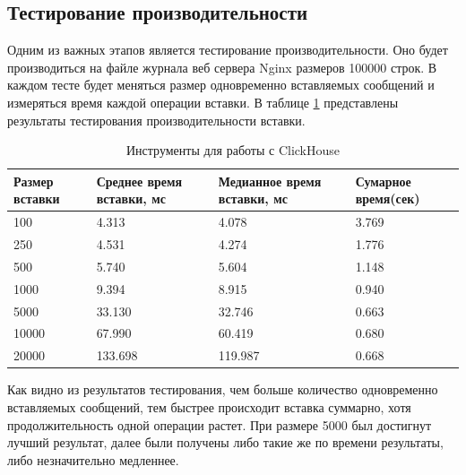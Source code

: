 \documentclass[14pt, russian]{scrartcl}
\begin{document}
\subsection{Тестирование производительности}

Одним из важных этапов является тестирование производительности. Оно будет
производиться на файле журнала веб сервера Nginx размеров 100000 строк.
В каждом тесте будет меняться размер одновременно вставляемых сообщений
и измеряться время каждой операции вставки.
В таблице \ref{table:tests_results} представлены результаты тестирования производительности вставки.

\begin{table}[H]
	\caption{\centering Инструменты для работы с ClickHouse}
	\centering
	\begin{tabularx}{\textwidth}{|X|X|X|l|}
		\hline
		\textbf{Размер вставки} & \textbf{Среднее время вставки, мс} & \textbf{Медианное время вставки, мс} & \textbf{Сумарное время(сек)} \\ \hline
		100                     & 4.313                              & 4.078                                & 3.769                        \\ \hline
		250                     & 4.531                              & 4.274                                & 1.776                        \\ \hline
		500                     & 5.740                              & 5.604                                & 1.148                        \\ \hline
		1000                    & 9.394                              & 8.915                                & 0.940                        \\ \hline
		5000                    & 33.130                             & 32.746                               & 0.663                        \\ \hline
		10000                   & 67.990                             & 60.419                               & 0.680                        \\ \hline
		20000                   & 133.698                            & 119.987                              & 0.668                        \\ \hline
	\end{tabularx}
	\label{table:tests_results}
\end{table}


Как видно из результатов тестирования,
чем больше количество одновременно вставляемых сообщений, тем 
быстрее происходит вставка суммарно, хотя продолжительность одной операции растет.
При размере 5000 был достигнут лучший результат, далее
были получены либо такие же по времени результаты, либо незначительно медленнее.
\end{document}
